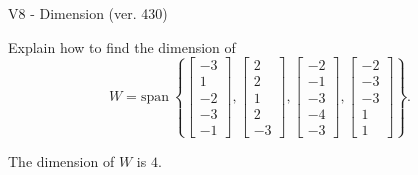 \begin{exercise}
  \begin{exerciseTitle}V8 - Dimension (ver. 430)\end{exerciseTitle}
  \begin{exerciseStatement}
    Explain how to find the dimension of 
\[W=\mathrm{span}\ \left\{\left[\begin{array}{r}
-3 \\
1 \\
-2 \\
-3 \\
-1
\end{array}\right] , \left[\begin{array}{r}
2 \\
2 \\
1 \\
2 \\
-3
\end{array}\right] , \left[\begin{array}{r}
-2 \\
-1 \\
-3 \\
-4 \\
-3
\end{array}\right] , \left[\begin{array}{r}
-2 \\
-3 \\
-3 \\
1 \\
1
\end{array}\right]\right\}.\]



  \end{exerciseStatement}
  \begin{exerciseAnswer}
   The dimension of \(W\) is  \(4\).
  


  \end{exerciseAnswer}
\end{exercise}